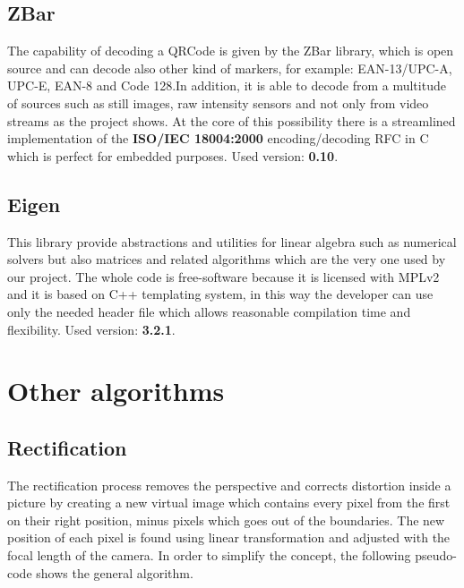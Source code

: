 \subsection{ZBar}

The capability of decoding a QRCode is given by the ZBar library, which is open source and can decode also other kind of markers, for example: EAN-13/UPC-A, UPC-E, EAN-8 and Code 128.In addition, it is able to decode from a multitude of sources such as still images, raw intensity sensors and not only from video streams as the project shows. At the core of this possibility there is a streamlined implementation of the \textbf{ISO/IEC 18004:2000} encoding/decoding RFC in C which is perfect for embedded purposes.
\newline Used version: \textbf{0.10}.

\subsection{Eigen}
This library provide abstractions and utilities for linear algebra such as numerical solvers but also matrices and related algorithms which are the very one used by our project.
The whole code is free-software because it is licensed with MPLv2 and it is based on C++ templating system, in this way the developer can use only the needed header file which allows reasonable compilation time and flexibility.\cite{eigeninfo}
\newline Used version: \textbf{3.2.1}.

\section{Other algorithms}

\subsection{Rectification}
The rectification process removes the perspective and corrects distortion inside a picture by creating a new virtual image which contains every pixel from the first on their right position, minus pixels which goes out of the boundaries.
The new position of each pixel is found using linear transformation and adjusted with the focal length of the camera.
In order to simplify the concept, the following pseudo-code shows the general algorithm.

